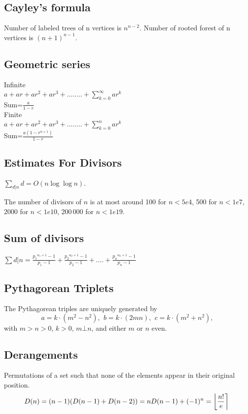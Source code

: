 \subsection{Cayley's formula}
Number of labeled trees of n vertices is $n^{n-2}$.
Number of rooted forest of n vertices is $(n+1)^{n-1}$.

\subsection{Geometric series}
Infinite \\
$a+ar+ar^2+ar^3+........+ \sum_{k=0}^{\infty} ar^k $	
\\
Sum=$\frac{a}{1-r}$
\\
Finite \\
$a+ar+ar^2+ar^3+........+ \sum_{k=0}^{n} ar^k $
\\
Sum=$\frac{a(1-r^{n+1})}{1-r}$


\subsection{Estimates For Divisors}

$\sum_{d|n} d = O(n \log \log n)$.

The number of divisors of $n$   is at most around 100 for $n < 5e4$, 500 for $n < 1e7$, 2000 for $n < 1e10$, 200\,000 for $n < 1e19$.

\subsection{Sum of divisors}

$\sum{d|n} =\frac{{p_1}^{\alpha_1+1}-1}{p_1-1}+\frac{{p_2}^{\alpha_2+1}-1}{p_2-1}+....+\frac{{p_n}^{\alpha_n+1}-1}{p_n-1}$

\subsection{Pythagorean Triplets}
The Pythagorean triples are uniquely generated by
\[ a=k\cdot (m^{2}-n^{2}),\ \,b=k\cdot (2mn),\ \,c=k\cdot (m^{2}+n^{2}), \]
with $m > n > 0$, $k > 0$, $m \bot n$, and either $m$ or $n$ even.


\subsection{Derangements}
Permutations of a set such that none of the elements appear in their original position.
\[ \mkern-2mu D(n) = (n-1)(D(n-1)+D(n-2)) = n D(n-1)+(-1)^n = \left\lfloor\frac{n!}{e}\right\rceil \]


